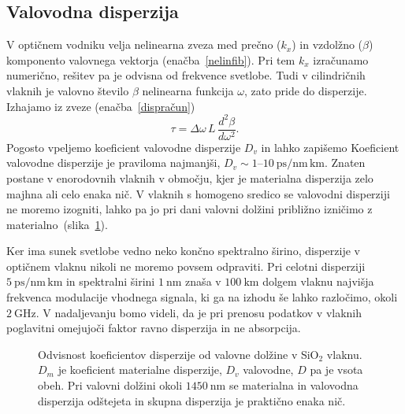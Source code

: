 \subsection*{Valovodna disperzija}
V optičnem vodniku velja nelinearna zveza med prečno ($k_x$) in vzdolžno ($\beta$)
komponento valovnega vektorja (enačba~\ref{nelinfib}). Pri tem $k_x$ izračunamo numerično, 
rešitev pa je odvisna od frekvence svetlobe. Tudi v cilindričnih vlaknih je valovno število 
$\beta$ nelinearna funkcija $\omega$, zato pride do disperzije. Izhajamo iz zveze 
(enačba~\ref{dispračun})
\begin{equation}
\tau = \Delta \omega\, L\, \frac{d^2 \beta}{d \omega^2}.
\end{equation}
Pogosto vpeljemo koeficient valovodne disperzije $D_v$
in lahko zapišemo
Koeficient valovodne disperzije je praviloma najmanjši, 
$D_v \sim 1$--$10~\si{\pico\second/\nano\meter\,\kilo\meter}$. 
Znaten postane v enorodovnih vlaknih v območju, kjer je materialna disperzija 
zelo majhna ali celo enaka nič. 
V vlaknih s homogeno sredico se valovodni disperziji ne moremo
izogniti, lahko pa jo pri dani valovni dolžini približno izničimo z materialno~(slika~\ref{fig:MatVal}). 

Ker ima sunek svetlobe vedno neko končno spektralno širino, disperzije 
v optičnem vlaknu nikoli ne moremo povsem odpraviti. Pri celotni disperziji 
$5~\si{\pico\second/\nano\meter\,\kilo\meter}$ in spektralni širini 
$1~\si{\nano\meter}$ znaša v $100~\si{\kilo\meter}$ dolgem vlaknu najvišja 
frekvenca modulacije vhodnega signala, ki ga na izhodu še lahko razločimo, 
okoli $2~\si{\giga\hertz}$. V nadaljevanju bomo videli, da je pri prenosu podatkov
v vlaknih poglavitni omejujoči faktor ravno disperzija in ne absorpcija. 

\begin{figure}[h]
\centering
\def\svgwidth{90truemm} 
 
\caption{Odvisnost koeficientov disperzije od valovne dolžine v SiO$_2$ vlaknu. $D_m$ 
je koeficient materialne disperzije, $D_v$ valovodne, $D$ pa je vsota obeh. Pri valovni dolžini
okoli $1450~\si{\nano\meter}$ se materialna in valovodna disperzija odštejeta in skupna disperzija
je praktično enaka nič.}
\label{fig:MatVal}
\end{figure}

